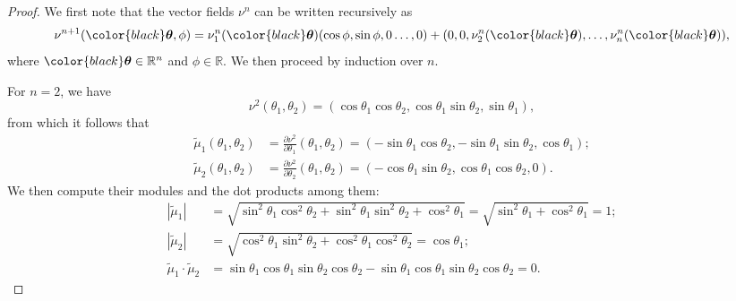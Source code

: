 \documentclass{amsart}
\theoremstyle{definition}
\theoremstyle{definition}
\theoremstyle{definition}
\begin{document}
\begin{proof}
	We first note that the vector fields $\nu^n$ can be written recursively as
		\[\nu^{n+1}({\color{black}\boldsymbol{\theta}},\phi)
		=\nu^n_1({\color{black}\boldsymbol{\theta}})
		(\cos \phi, \sin \phi,0\dots,0)
		+(0,0,\nu^n_2({\color{black}\boldsymbol{\theta}}),
		\dots,\nu^n_n({\color{black}\boldsymbol{\theta}})),\]
	where ${\color{black}\boldsymbol{\theta}} 
	\in \mathbb{R}^n$ and $\phi \in \mathbb{R}$.
	We then proceed by induction over $n$.
	
	For $n=2$, we have
		\[\nu^2(\theta_1,\theta_2)=(\cos\theta_1\cos\theta_2,\cos\theta_1\sin\theta_2,\sin\theta_1),\]
	from which {\color{black}it} follows that
	\begin{align*}
		\tilde\mu_1(\theta_1,\theta_2)&=\frac{\partial \nu^2}{\partial \theta_1}(\theta_1,\theta_2)=(-\sin\theta_1\cos\theta_2,-\sin\theta_1\sin\theta_2,\cos\theta_1); \\
		\tilde\mu_2(\theta_1,\theta_2)&=\frac{\partial \nu^2}{\partial \theta_2}(\theta_1,\theta_2)=(-\cos\theta_1\sin\theta_2,\cos\theta_1\cos\theta_2,0).
	\end{align*}
	We then compute their modules and the dot products among them:
	\begin{align*}
		|\tilde\mu_1|&=\sqrt{\sin^2\theta_1\cos^2\theta_2+\sin^2\theta_1\sin^2\theta_2+\cos^2\theta_1}=\sqrt{\sin^2\theta_1+\cos^2\theta_1}=1;\\
		|\tilde\mu_2|&=\sqrt{\cos^2\theta_1\sin^2\theta_2+\cos^2\theta_1\cos^2\theta_2}=\cos\theta_1;\\
		\tilde\mu_1\cdot\tilde\mu_2&=\sin\theta_1\cos\theta_1\sin\theta_2\cos\theta_2-\sin\theta_1\cos\theta_1\sin\theta_2\cos\theta_2=0.
	\end{align*}
	

\end{proof}
\end{document}
